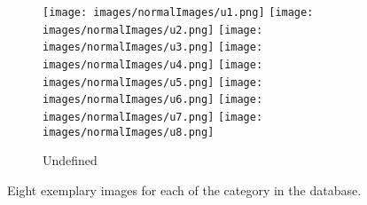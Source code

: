 \documentclass[review,12pt,3p]{elsarticle}
\begin{document}
\begin{figure}
        \begin{subfigure}[b]{0.5\textwidth}
                \texttt{[image: images/normalImages/u1.png]}
                \texttt{[image: images/normalImages/u2.png]}
                \texttt{[image: images/normalImages/u3.png]}
                \texttt{[image: images/normalImages/u4.png]}
                \texttt{[image: images/normalImages/u5.png]}
                \texttt{[image: images/normalImages/u6.png]}
                \texttt{[image: images/normalImages/u7.png]}
                \texttt{[image: images/normalImages/u8.png]}
                \caption{Undefined}\label{fig:dataset_6}
        \end{subfigure}%
        \caption{Eight exemplary images for each of the category in the database.}
        \label{fig:dataset}
\end{figure}
\end{document}
